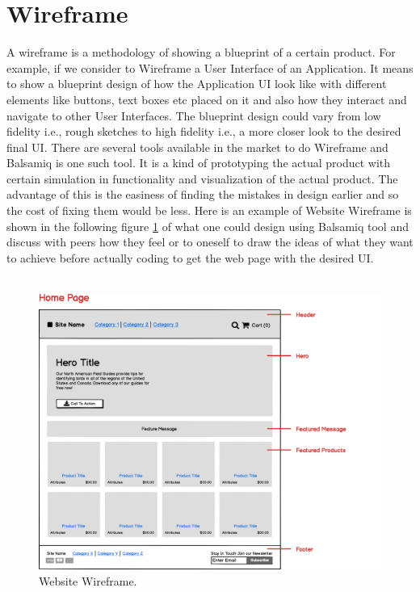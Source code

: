 \section{Wireframe}

A wireframe is a methodology of showing a blueprint of a certain product. For example, if we consider to Wireframe a User Interface of an Application. It means to show a blueprint design of how the Application UI look like with different elements like buttons, text boxes etc placed on it and also how they interact and navigate to other User Interfaces. The blueprint design could vary from low fidelity i.e., rough sketches to high fidelity i.e., a more closer look to the desired final UI. There are several tools available in the market to do Wireframe and Balsamiq \cite{B} is one such tool. It is a kind of prototyping the actual product with certain simulation in functionality and visualization of the actual product. The advantage of this is the easiness of finding the mistakes in design earlier and so the cost of fixing them would be less. Here is an example of Website Wireframe is shown in the following figure \ref{fig:wireframe_website} of what one could design using Balsamiq tool and discuss with peers how they feel or to oneself to draw the ideas of what they want to achieve before actually coding to get the web page with the desired UI. \\ \\

\begin{figure}[hbt!]
	\centering
	\includegraphics[width=\linewidth]{figures/wireframe_website}
	\caption{Website Wireframe.\cite{B}}
	\label{fig:wireframe_website}
\end{figure}

\let\cleardoublepage\clearpage